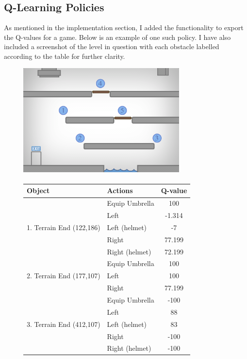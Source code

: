 \documentclass[a4paper,oneside]{report}
\begin{document}
\newpage

\subsection{Q-Learning Policies}

As mentioned in the implementation section, I added the functionality to export the Q-values for a game. Below is an example of one such policy. I have also included a screenshot of the level in question with each obstacle labelled according to the table for further clarity.

\begin{figure}[H]
\centering    
\includegraphics[width=85mm]{sources/images/Level2} \paragraph{}
    
\begin{tabular}{|l|l|c|}
\hline
Object & Actions & Q-value \\ \hline

\multirow{5}{*}{1. Terrain End (122,186)} & Equip Umbrella & 100 \\
 & Left & -1.314 \\
 & Left (helmet) & -7 \\
 & Right & 77.199 \\ 
 & Right (helmet) & 72.199 \\ \hline
 
\multirow{3}{*}{2. Terrain End (177,107)} & Equip Umbrella & 100 \\
 & Left & 100 \\
 & Right & 77.199 \\ \hline
 
\multirow{5}{*}{3. Terrain End (412,107)} & Equip Umbrella & -100 \\
 & Left & 88 \\
 & Left (helmet) & 83 \\
 & Right & -100 \\
 & Right (helmet) & -100 \\ \hline


\end{tabular}
\end{figure}
\end{document}
